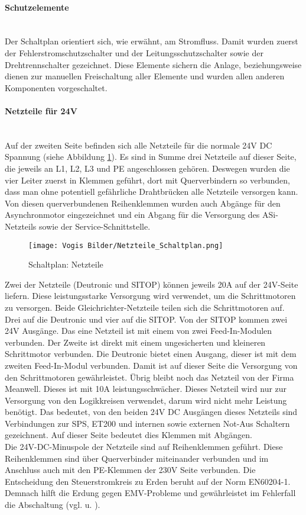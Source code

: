     \paragraph{Schutzelemente }\mbox{}\\
    Der Schaltplan orientiert sich, wie erwähnt, am Stromfluss. Damit wurden zuerst der Fehlerstromschutzschalter und der Leitungsschutzschalter sowie der Drehtrennschalter gezeichnet. Diese Elemente sichern die Anlage, beziehungsweise dienen zur manuellen Freischaltung aller Elemente und wurden allen anderen Komponenten vorgeschaltet.
    \paragraph{Netzteile für 24V }\mbox{}\\
    Auf der zweiten Seite befinden sich alle Netzteile für die normale 24V DC Spannung (siehe Abbildung \ref{fig:Netzteile}). Es sind in Summe drei Netzteile auf dieser Seite, die jeweils an L1, L2, L3 und PE angeschlossen gehören. Deswegen wurden die vier Leiter zuerst in Klemmen geführt, dort mit Querverbindern so verbunden, dass man ohne potentiell gefährliche Drahtbrücken alle Netzteile versorgen kann. Von diesen querverbundenen Reihenklemmen wurden auch Abgänge für den Asynchronmotor eingezeichnet und ein Abgang für die Versorgung des ASi-Netzteils sowie der Service-Schnittstelle.\\ 
    \begin{figure}[H]
        \centering
        \texttt{[image: Vogis Bilder/Netzteile\_Schaltplan.png]}
        \caption{Schaltplan: Netzteile}
        \label{fig:Netzteile}
    \end{figure}
    Zwei der Netzteile (Deutronic und SITOP) können jeweils 20A auf der 24V-Seite liefern. Diese leistungsstarke Versorgung wird verwendet, um die Schrittmotoren zu versorgen. Beide Gleichrichter-Netzteile teilen sich die Schrittmotoren auf. Drei auf die Deutronic und vier auf die SITOP. Von der SITOP kommen zwei 24V Ausgänge. Das eine Netzteil ist mit einem von zwei Feed-In-Modulen verbunden. Der Zweite ist direkt mit einem ungesicherten und kleineren Schrittmotor verbunden. Die Deutronic bietet einen Ausgang, dieser ist mit dem zweiten Feed-In-Modul verbunden. Damit ist auf dieser Seite die Versorgung von den Schrittmotoren gewährleistet. Übrig bleibt noch das Netzteil von der Firma Meanwell. Dieses ist mit 10A leistungsschwächer. Dieses Netzteil wird nur zur Versorgung von den Logikkreisen verwendet, darum wird nicht mehr Leistung benötigt. Das bedeutet, von den beiden 24V DC Ausgängen dieses Netzteils sind Verbindungen zur SPS, ET200 und internen sowie externen Not-Aus Schaltern gezeichnent. Auf dieser Seite bedeutet dies Klemmen mit Abgängen.\\    
    Die 24V-DC-Minuspole der Netzteile sind auf Reihenklemmen geführt. Diese Reihenklemmen sind über Querverbinder miteinander verbunden und im Anschluss auch mit den PE-Klemmen der 230V Seite verbunden. Die Entscheidung den Steuerstromkreis zu Erden beruht auf der Norm EN60204-1. Demnach hilft die Erdung gegen EMV-Probleme und gewährleistet im Fehlerfall die Abschaltung (vgl. \cite{elektronet_steuerstromkreis_geerdet} u. \cite{beckhoff_steuerstromkreis_geerdet}).
